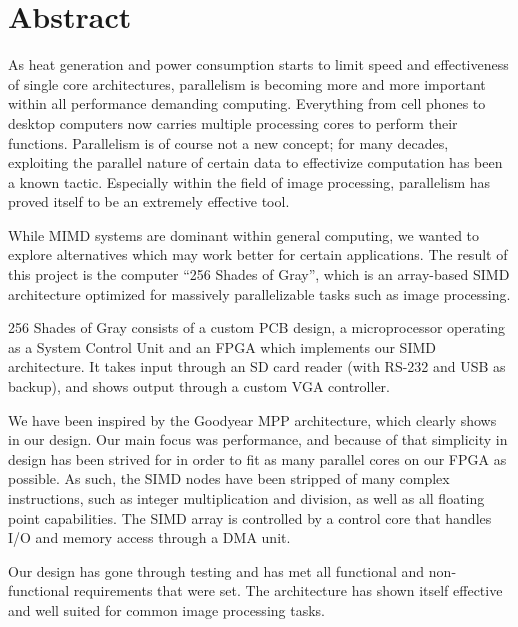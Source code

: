 \begingroup
\let\clearpage\relax
\let\cleardoublepage\relax
\let\cleardoublepage\relax

\chapter*{Abstract}
As heat generation and power consumption starts to limit speed and effectiveness
of single core architectures, parallelism is becoming more and more important
within all performance demanding computing. Everything from cell phones to
desktop computers now carries multiple processing cores to perform their
functions. Parallelism is of course not a new concept; for many decades,
exploiting the parallel nature of certain data to effectivize computation has
been a known tactic. Especially within the field of image processing,
parallelism has proved itself to be an extremely effective tool.

While \ac{MIMD} systems are dominant within general computing, we wanted to
explore alternatives which may work better for certain applications. The result
of this project is the computer ``256 Shades of Gray'', which is an array-based
\ac{SIMD} architecture optimized for massively parallelizable tasks such as
image processing.

256 Shades of Gray consists of a custom PCB design, a microprocessor operating
as a System Control Unit and an FPGA which implements our SIMD architecture. It
takes input through an SD card reader (with RS-232 and USB as backup), and shows
output through a custom VGA controller.

We have been inspired by the Goodyear MPP architecture, which clearly shows in
our design. Our main focus was performance, and because of that simplicity in
design has been strived for in order to fit as many parallel cores on our FPGA
as possible. As such, the SIMD nodes have been stripped of many
complex instructions, such as integer multiplication and division, as well as
all floating point capabilities. The SIMD array is controlled by a control core
that handles I/O and memory access through a DMA unit.

Our design has gone through testing and has met all functional and
non-functional requirements that were set. The architecture has shown itself
effective and well suited for common image processing tasks.
\endgroup
